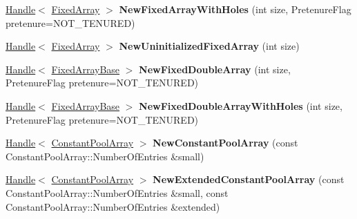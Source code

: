 \begin{DoxyCompactItemize}
\item 
\hypertarget{classv8_1_1internal_1_1_v8___f_i_n_a_l_ad4e6ae8372a46035e4edf0d7e19db0ed}{}\hyperlink{classv8_1_1internal_1_1_handle}{Handle}$<$ \hyperlink{classv8_1_1internal_1_1_fixed_array}{Fixed\+Array} $>$ {\bfseries New\+Fixed\+Array\+With\+Holes} (int size, Pretenure\+Flag pretenure=N\+O\+T\+\_\+\+T\+E\+N\+U\+R\+E\+D)\label{classv8_1_1internal_1_1_v8___f_i_n_a_l_ad4e6ae8372a46035e4edf0d7e19db0ed}

\item 
\hypertarget{classv8_1_1internal_1_1_v8___f_i_n_a_l_a6aa22f0186803d8e418d7c5f3edc0a41}{}\hyperlink{classv8_1_1internal_1_1_handle}{Handle}$<$ \hyperlink{classv8_1_1internal_1_1_fixed_array}{Fixed\+Array} $>$ {\bfseries New\+Uninitialized\+Fixed\+Array} (int size)\label{classv8_1_1internal_1_1_v8___f_i_n_a_l_a6aa22f0186803d8e418d7c5f3edc0a41}

\item 
\hypertarget{classv8_1_1internal_1_1_v8___f_i_n_a_l_a46f0755cd3308e62dd1b0ca6a1082516}{}\hyperlink{classv8_1_1internal_1_1_handle}{Handle}$<$ \hyperlink{classv8_1_1internal_1_1_fixed_array_base}{Fixed\+Array\+Base} $>$ {\bfseries New\+Fixed\+Double\+Array} (int size, Pretenure\+Flag pretenure=N\+O\+T\+\_\+\+T\+E\+N\+U\+R\+E\+D)\label{classv8_1_1internal_1_1_v8___f_i_n_a_l_a46f0755cd3308e62dd1b0ca6a1082516}

\item 
\hypertarget{classv8_1_1internal_1_1_v8___f_i_n_a_l_a38e1ab43f56e2fc44f370695cb8fed2a}{}\hyperlink{classv8_1_1internal_1_1_handle}{Handle}$<$ \hyperlink{classv8_1_1internal_1_1_fixed_array_base}{Fixed\+Array\+Base} $>$ {\bfseries New\+Fixed\+Double\+Array\+With\+Holes} (int size, Pretenure\+Flag pretenure=N\+O\+T\+\_\+\+T\+E\+N\+U\+R\+E\+D)\label{classv8_1_1internal_1_1_v8___f_i_n_a_l_a38e1ab43f56e2fc44f370695cb8fed2a}

\item 
\hypertarget{classv8_1_1internal_1_1_v8___f_i_n_a_l_a2c5aabf1ebb85451c4055a24b80384f6}{}\hyperlink{classv8_1_1internal_1_1_handle}{Handle}$<$ \hyperlink{classv8_1_1internal_1_1_constant_pool_array}{Constant\+Pool\+Array} $>$ {\bfseries New\+Constant\+Pool\+Array} (const Constant\+Pool\+Array\+::\+Number\+Of\+Entries \&small)\label{classv8_1_1internal_1_1_v8___f_i_n_a_l_a2c5aabf1ebb85451c4055a24b80384f6}

\item 
\hypertarget{classv8_1_1internal_1_1_v8___f_i_n_a_l_a343ad783e71af57bb1c15850ced226d8}{}\hyperlink{classv8_1_1internal_1_1_handle}{Handle}$<$ \hyperlink{classv8_1_1internal_1_1_constant_pool_array}{Constant\+Pool\+Array} $>$ {\bfseries New\+Extended\+Constant\+Pool\+Array} (const Constant\+Pool\+Array\+::\+Number\+Of\+Entries \&small, const Constant\+Pool\+Array\+::\+Number\+Of\+Entries \&extended)\label{classv8_1_1internal_1_1_v8___f_i_n_a_l_a343ad783e71af57bb1c15850ced226d8}


\end{DoxyCompactItemize}
